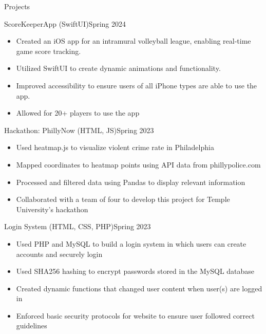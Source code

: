 \documentclass[]{mcdowellcv}
\begin{document}
	\begin{cvsection}{Projects}
		\begin{cvsubsection}{ScoreKeeperApp (SwiftUI)}{}{Spring 2024}
			\begin{itemize}
				\item Created an iOS app for an intramural volleyball league, enabling real-time game score tracking.
				\item Utilized SwiftUI to create dynamic animations and functionality.
				\item Improved accessibility to ensure users of all iPhone types are able to use the app.
				\item Allowed for 20+ players to use the app 
			\end{itemize}
		\end{cvsubsection}

		\begin{cvsubsection}{Hackathon: PhillyNow (HTML, JS)}{}{Spring 2023}
			\begin{itemize}
				\item Used heatmap.js to visualize violent crime rate in Philadelphia
				\item Mapped coordinates to heatmap points using API data from phillypolice.com
				\item Processed and filtered data using Pandas to display relevant information
				\item Collaborated with a team of four to develop this project for Temple University's hackathon
			\end{itemize}
		\end{cvsubsection}

		\begin{cvsubsection}{Login System (HTML, CSS, PHP)}{}{Spring 2023}
			\begin{itemize}
				\item Used PHP and MySQL to build a  login system in which users can create accounts and securely login
				\item Used SHA256 hashing to encrypt passwords stored in the MySQL database
				\item Created dynamic functions that changed user content when user(s) are logged in
				\item Enforced basic security protocols for website to ensure user followed correct guidelines
			\end{itemize}
		\end{cvsubsection}
	\end{cvsection}
\end{document}
